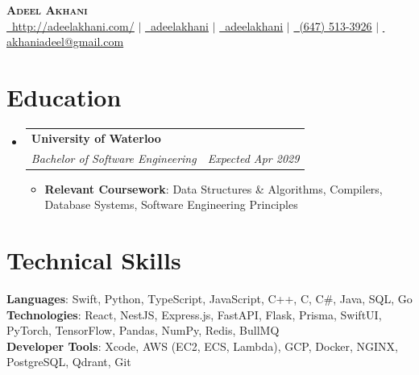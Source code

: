 \documentclass[letterpaper,11pt]{article}
\makeatletter
\newcommand{\resumeItem}[1]{
  \item\small{
    {#1 \vspace{-2pt}}
  }
}
\newcommand{\resumeSubheading}[4]{
  \vspace{-2pt}\item
    \begin{tabular*}{0.97\textwidth}[t]{l@{\extracolsep{\fill}}r}
      \textbf{#1} & #2 \\
      \textit{\small#3} & \textit{\small #4} \\
    \end{tabular*}\vspace{-7pt}
}
\newcommand{\resumeSubHeadingListStart}{\begin{itemize}[leftmargin=0.15in, label={}]}
\newcommand{\resumeSubHeadingListEnd}{\end{itemize}}
\newcommand{\resumeItemListStart}{\begin{itemize}}
\newcommand{\resumeItemListEnd}{\end{itemize}\vspace{-5pt}}
\makeatother
\begin{document}
\begin{center}
    \textbf{\Huge \scshape Adeel Akhani} \\ \vspace{1pt}
    \small
    \href{http://adeelakhani.com/}{\faGlobe\, \underline{http://adeelakhani.com/}} $|$
    \href{https://www.linkedin.com/in/adeelakhani/}{\faLinkedin\, \underline{adeelakhani}} $|$ 
    \href{https://github.com/adeelakhani}{\faGithub\, \underline{adeelakhani}} $|$
    \href{tel:(647) 513-3926}{\faMobile*\, (647) 513-3926} $|$
    \href{mailto:akhaniadeel@gmail.com}{\faEnvelope\, \underline{akhaniadeel@gmail.com}}
\end{center}
\section{Education}
    \resumeSubHeadingListStart
        \resumeSubheading
            {University of Waterloo}{}
            {Bachelor of Software Engineering}{\textit{Expected Apr 2029}}
            \resumeItemListStart
                \resumeItem{\textbf{Relevant Coursework}: Data Structures \& Algorithms, Compilers, Database Systems, Software Engineering Principles}
            \resumeItemListEnd
        \resumeSubHeadingListEnd
\section{Technical Skills}
\begin{itemize}[leftmargin=0.15in, label={}]
    \small{\item{
    \textbf{Languages}{: Swift, Python, TypeScript, JavaScript, C++, C, C\#, Java, SQL, Go} \\
    \textbf{Technologies}{: React, NestJS, Express.js, FastAPI, Flask, Prisma, SwiftUI, PyTorch, TensorFlow, Pandas, NumPy, Redis, BullMQ} \\
    \textbf{Developer Tools}{: Xcode, AWS (EC2, ECS, Lambda), GCP, Docker, NGINX, PostgreSQL, Qdrant, Git}
    }}
\end{itemize}
\end{document}
